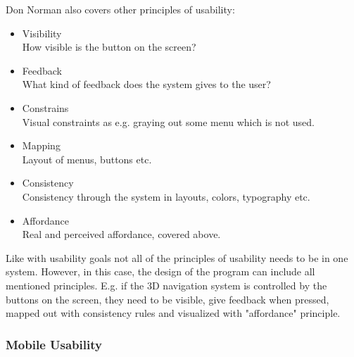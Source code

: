 Don Norman also covers other principles of usability:\cite {Normans}
\begin{itemize}
\item Visibility\\
How visible is the button on the screen?
\item Feedback\\
What kind of feedback does the system gives to the user?
\item Constrains\\
Visual constraints as e.g. graying out some menu which is not used.
\item Mapping \\
Layout of menus, buttons etc.
\item Consistency\\
Consistency through the system in layouts, colors, typography etc.
\item Affordance\\
Real and perceived affordance, covered above.
\end{itemize}

Like with usability goals not all of the principles of usability needs to be in 
one system. However, in this case, the design of the program can include all 
mentioned principles. E.g. if the 3D navigation system is controlled by the 
buttons on the screen, they need to be visible, give   feedback when 
pressed, mapped out with consistency rules and visualized with "affordance" 
principle. 

\subsubsection{Mobile Usability}
\label{MobileUsability}

